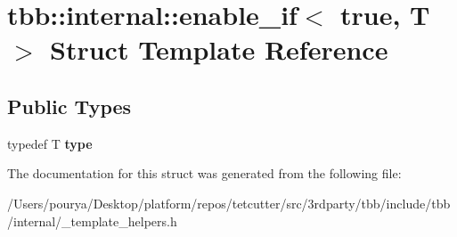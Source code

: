\hypertarget{structtbb_1_1internal_1_1enable__if_3_01true_00_01T_01_4}{}\section{tbb\+:\+:internal\+:\+:enable\+\_\+if$<$ true, T $>$ Struct Template Reference}
\label{structtbb_1_1internal_1_1enable__if_3_01true_00_01T_01_4}
\subsection*{Public Types}
\begin{DoxyCompactItemize}
\item 
\hypertarget{structtbb_1_1internal_1_1enable__if_3_01true_00_01T_01_4_a17f3ba014f84ba095a908d6bde9e164f}{}typedef T {\bfseries type}\label{structtbb_1_1internal_1_1enable__if_3_01true_00_01T_01_4_a17f3ba014f84ba095a908d6bde9e164f}

\end{DoxyCompactItemize}


The documentation for this struct was generated from the following file\+:\begin{DoxyCompactItemize}
\item 
/\+Users/pourya/\+Desktop/platform/repos/tetcutter/src/3rdparty/tbb/include/tbb/internal/\+\_\+template\+\_\+helpers.\+h\end{DoxyCompactItemize}
